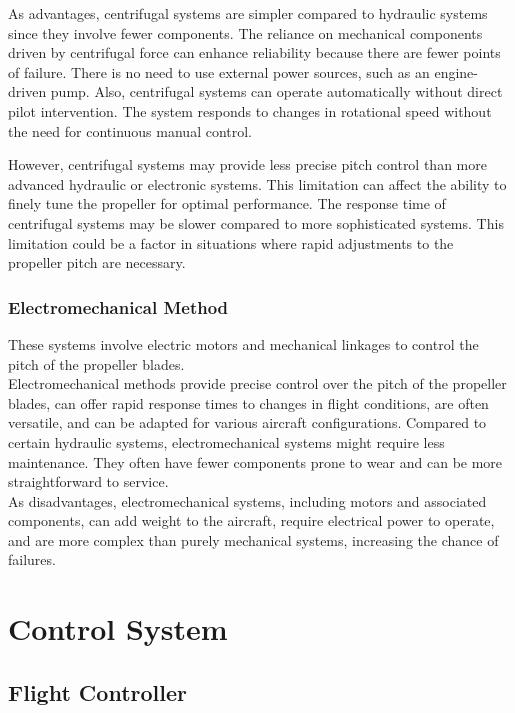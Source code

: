 As advantages, centrifugal systems are simpler compared to hydraulic systems since they involve fewer components.
The reliance on mechanical components driven by centrifugal force can enhance reliability because there are fewer points of failure.
There is no need to use external power sources, such as an engine-driven pump.
Also, centrifugal systems can operate automatically without direct pilot intervention.
The system responds to changes in rotational speed without the need for continuous manual control.

However, centrifugal systems may provide less precise pitch control than more advanced hydraulic or electronic systems. This limitation can affect the ability to finely tune the propeller for optimal performance.
The response time of centrifugal systems may be slower compared to more sophisticated systems. This limitation could be a factor in situations where rapid adjustments to the propeller pitch are necessary.\cite{VPP2}

\subsubsection{Electromechanical Method}
These systems involve electric motors and mechanical linkages to control the pitch of the propeller blades.\\

Electromechanical methods provide precise control over the pitch of the propeller blades, can offer rapid response times to changes in flight conditions, are often versatile, and can be adapted for various aircraft configurations.
Compared to certain hydraulic systems, electromechanical systems might require less maintenance.
They often have fewer components prone to wear and can be more straightforward to service.\\

As disadvantages, electromechanical systems, including motors and associated components, can add weight to the aircraft, require electrical power to operate, and are more complex than purely mechanical systems, increasing the chance of failures.\cite{VPP2}

\section{Control System}
\subsection{Flight Controller}
